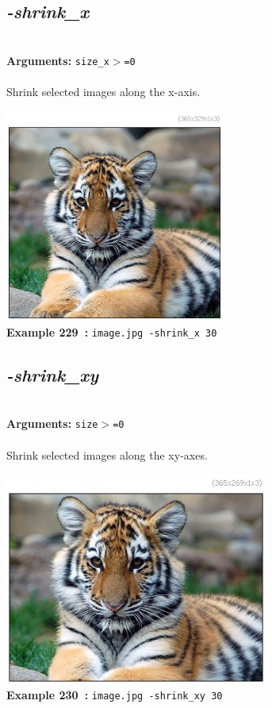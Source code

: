 \documentclass[a4paper,11pt,twoside]{book}
\begin{document}
\subsection{\emph{-shrink\_x} }\vspace*{-0.5em}
~\\\textbf{Arguments: } 
{\small \texttt{size\_x$>$=0}}\\~\\
Shrink selected images along the x-axis.
\begin{center}\includegraphics[keepaspectratio=true,height=7cm,width=\textwidth]{img/gmic_def229.jpg}\\
{\footnotesize \textbf{Example 229~:} \texttt{image.jpg -shrink\_x 30}}
\end{center}

\subsection{\emph{-shrink\_xy} }\vspace*{-0.5em}
~\\\textbf{Arguments: } 
{\small \texttt{size$>$=0}}\\~\\
Shrink selected images along the xy-axes.
\begin{center}\includegraphics[keepaspectratio=true,height=7cm,width=\textwidth]{img/gmic_def230.jpg}\\
{\footnotesize \textbf{Example 230~:} \texttt{image.jpg -shrink\_xy 30}}
\end{center}
\end{document}
